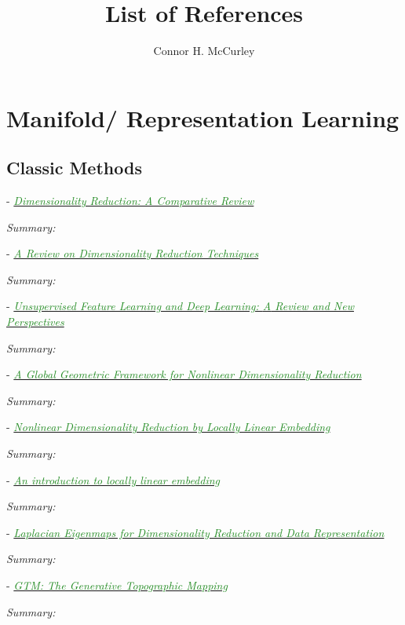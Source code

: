 \documentclass[]{article}
\title{List of References}
\author{Connor H. McCurley}
\date{}
\newcommand{\paperentry}[4]{
            \hangindent=1cm
            \cite{#1} - \href{run:../References/#3}{\textcolor{ForestGreen}{\textit{#2}}}
            
            \noindent            
            \begin{minipage}[t]{0.1\linewidth}\hfill\end{minipage}
            \begin{minipage}[t]{0.8\linewidth}\textcolor{NavyBlue}{{\textit{Summary:}}}#4\end{minipage}
            \vspace{.25cm}
          }
\begin{document}
\maketitle

\tableofcontents

\newpage

      
\section{Manifold/ Representation Learning}

	\subsection{Classic Methods}

	\paperentry{VanDerMaaten2009DRReview}
	{Dimensionality Reduction: A Comparative Review}
	{Manifold_Representation_Learning/Reviews/VanDerMaaten2009DRReview.pdf}
	{}
	
	\paperentry{Jindal2017ReviewDRTechniques}
	{A Review on Dimensionality Reduction Techniques}
	{Manifold_Representation_Learning/Reviews/Jindal2017ReviewDRTechniques.pdf}
	{}

	\paperentry{Bengio2014RepLearningReview}
	{Unsupervised Feature Learning and Deep Learning: {A} Review and New Perspectives}
	{Manifold_Representation_Learning/Reviews/Bengio2014RepLearningReview.pdf}
	{}
	
	\paperentry{Tenenbaum2000Isomap}
	{A Global Geometric Framework for Nonlinear Dimensionality Reduction}
	{Manifold_Representation_Learning/Manifold/Tenenbaum2000Isomap.pdf}
	{}
	
	\paperentry{Roweis2000LLE}
	{Nonlinear Dimensionality Reduction by Locally Linear Embedding}
	{Manifold_Representation_Learning/Manifold/Roweis2000LLE.pdf}
	{}
	
	\paperentry{Saul2001LLEIntro}
	{An introduction to locally linear embedding}
	{Manifold_Representation_Learning/Manifold/Saul2001LLEIntro.pdf}
	{}
	
	\paperentry{Belkin2003LaplacianEigenmaps}
	{Laplacian Eigenmaps for Dimensionality Reduction and Data Representation}
	{Manifold_Representation_Learning/Manifold/Belkin2003LaplacianEigenmaps.pdf}
	{}
	
	
	\paperentry{Bishop1998GTM}
	{GTM: The Generative Topographic Mapping}
	{Manifold_Representation_Learning/Manifold/Bishop1998GTM.pdf}
	{}
	
\end{document}
